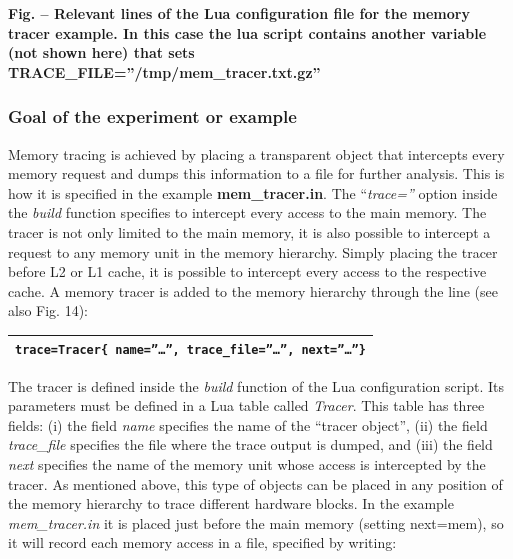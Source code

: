 \documentclass[a4paper]{article}
\newcounter{Figure}
\renewcommand\theFigure{\arabic{Figure}}
\begin{document}
{\centering{}\sffamily\bfseries
\label{bkm:Ref388170583}Fig.
\stepcounter{Figure}{\theFigure} -- Relevant lines of the Lua
configuration file for the memory tracer example. In this case the lua
script contains another variable (not shown here) that sets
TRACE\_FILE={\textquotedblright}/tmp/mem\_tracer.txt.gz{\textquotedblright}
\par}

\subsubsection[Goal of the experiment or example]{\rmfamily Goal of the
experiment or example}
{
Memory tracing is achieved by placing a transparent object that
intercepts every memory request and dumps this information to a file
for further analysis. This is how it is specified in the example
\textbf{mem\_tracer.in}. The
{\textquotedblleft}\textit{trace={\textquotedblright}} option inside
the \textit{build} function specifies to intercept every access to the
main memory. The tracer is not only limited to the main memory, it is
also possible to intercept a request to any memory unit in the memory
hierarchy. Simply placing the tracer before L2 or L1 cache, it is
possible to intercept every access to the respective cache. A memory
tracer is added to the memory hierarchy through the line (see also Fig.
14):}

\begin{flushleft}
\tablehead{}
\begin{supertabular}{|m{6.21846in}|}
\hline
{} \texttt{trace=Tracer\{
name={\textquotedblright}{\dots}{\textquotedblright},
trace\_file={\textquotedblright}{\dots}{\textquotedblright},
next={\textquotedblright}{\dots}{\textquotedblright}\}}\\\hline
\end{supertabular}
\end{flushleft}

The tracer is defined inside the \textit{build} function of the Lua
configuration script. Its parameters must be defined in a Lua table
called \textit{Tracer}. This table has three fields: (i) the field
\textit{name} specifies the name of the {\textquotedblleft}tracer
object{\textquotedblright}, (ii) the field \textit{trace\_file}
specifies the file where the trace output is dumped, and (iii) the
field \textit{next} specifies the name of the memory unit whose access
is intercepted by the tracer. As mentioned above, this type of objects
can be placed in any position of the memory hierarchy to trace
different hardware blocks. In the example \textit{mem\_tracer.in} it is
placed just before the main memory (setting next=mem), so it will
record each memory access in a file, specified by writing:
\end{document}
